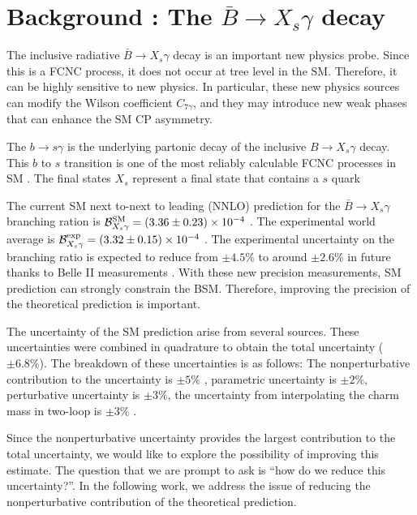 \chapter{Background :  The $\bar{B}\rightarrow X_s\gamma$ decay}
The inclusive radiative $\bar{B}\rightarrow X_s\gamma$ decay is an important new physics probe. Since this is a FCNC process, it does not occur at tree level in the SM. Therefore, it can be highly sensitive to new physics. In particular, these new physics sources can modify the Wilson coefficient $C_{7\gamma}$, and they may introduce new weak phases that can enhance the SM CP asymmetry.\par
The $b\rightarrow s\gamma$ is the underlying partonic decay of the inclusive $B\rightarrow X_s\gamma$ decay. This $b$ to $s$ transition is one of the most reliably calculable FCNC processes in SM \cite{Ritchie:2013xc}. The final states $X_s$ represent a final state that contains a $s$ quark\par
The current SM next to-next to leading (NNLO) prediction for the $\bar{B}\rightarrow X_s\gamma$ branching ration is $\mathcal{B}^{\rm{SM}}_{X_s\gamma}=(3.36\pm0.23)\times 10^{-4}$ \cite{Misiak:2015xwa, Czakon:2015exa}. The experimental world average is $\mathcal{B}^{\rm{exp}}_{X_s\gamma}= (3.32\pm0.15)\times 10^{-4}$ \cite{Amhis:2019ckw, Chen:2001fja, Aubert:2007my, Lees:2012wg, Lees:2012ym, Saito:2014das, Belle:2016ufb}. The experimental uncertainty on the branching ratio is expected to reduce from $\pm 4.5\%$ to around $\pm 2.6\%$ in future thanks to Belle II measurements \cite{Kou:2018nap}. With these new precision measurements, SM prediction can strongly constrain the BSM. Therefore, improving the precision of the theoretical prediction is important.\par

The uncertainty of the SM prediction  arise from several sources. These uncertainties were combined in quadrature to obtain the total uncertainty ($\pm 6.8\%$). The breakdown of these uncertainties is as follows:
The nonperturbative contribution to the uncertainty is $\pm 5\%$ \cite{Benzke:2010js}, parametric uncertainty is $\pm 2\%$, perturbative uncertainty is $\pm 3\%$, the uncertainty from interpolating the charm mass in two-loop is $\pm 3\%$ \cite{Czakon:2015exa}.\par

Since the nonperturbative uncertainty provides the largest contribution to the total uncertainty, we would like to explore the possibility of improving this estimate. The question that we are prompt to ask is ``how do we reduce this uncertainty?''. In the following work, we address the issue of reducing the nonperturbative contribution of the theoretical prediction.

